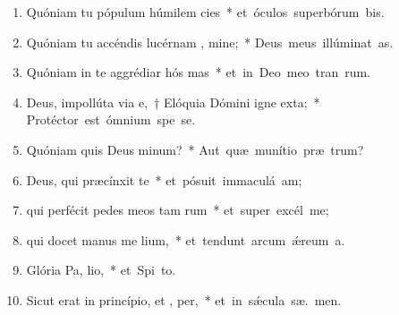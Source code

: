 \begin{flushleft}
\begin{enumerate}[leftmargin=*]
\item Quóniam tu pópulum húmilem  cies~* \mbox{et óculos superbórum bis.}

\item Quóniam tu accéndis lucérnam , mine;~* \mbox{Deus meus illúminat  as.}

\item Quóniam in te aggrédiar hós mas~* \mbox{et in Deo meo tran rum.}

\item Deus, impollúta via e,~† Elóquia Dómini igne exta;~* \mbox{Protéctor est ómnium spe  se.}

\item Quóniam quis Deus  minum?~* \mbox{Aut quæ munítio præ  trum?}

\item Deus, qui præcínxit  te~* \mbox{et pósuit immaculá  am;}

\item qui perfécit pedes meos tam rum~* \mbox{et super excél  me;}

\item qui docet manus me  lium,~* \mbox{et tendunt arcum \'{\ae}reum  a.}

\item Glória Pa,  lio,~* \mbox{et Spi to.}

\item Sicut erat in princípio, et ,  per,~* \mbox{et in s\'{\ae}cula sæ. men.}

\end{enumerate}
\end{flushleft}

